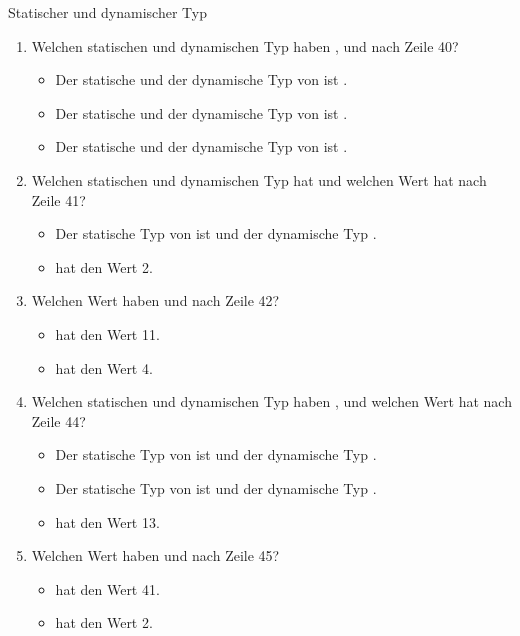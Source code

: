 \documentclass{../preamble}
\begin{document}
\begin{task}[credit = \stars{2}{3}]{Statischer und dynamischer Typ}
    \begin{solution}
        \begin{enumerate}[label = (\arabic*)]
            \item Welchen statischen und dynamischen Typ haben ,  und  nach Zeile 40?
                  \begin{itemize}
                      \item Der statische und der dynamische Typ von  ist .
                      \item Der statische und der dynamische Typ von  ist .
                      \item Der statische und der dynamische Typ von  ist .
                  \end{itemize}
            \item Welchen statischen und dynamischen Typ hat  und welchen Wert hat  nach Zeile 41?
                  \begin{itemize}
                      \item Der statische Typ von  ist  und der dynamische Typ .
                      \item {} hat den Wert 2.
                  \end{itemize}
            \item Welchen Wert haben  und  nach Zeile 42?
                  \begin{itemize}
                      \item {} hat den Wert 11.
                      \item {} hat den Wert 4.
                  \end{itemize}
            \item Welchen statischen und dynamischen Typ haben ,  und welchen Wert hat  nach Zeile 44?
                  \begin{itemize}
                      \item Der statische Typ von  ist  und der dynamische Typ .
                      \item Der statische Typ von  ist  und der dynamische Typ .
                      \item {} hat den Wert 13.
                  \end{itemize}
            \item Welchen Wert haben  und  nach Zeile 45?
                  \begin{itemize}
                      \item {} hat den Wert 41.
                      \item {} hat den Wert 2.
                  \end{itemize}
        \end{enumerate}
    \end{solution}
\end{task}
\end{document}
